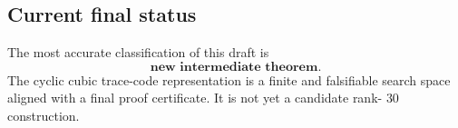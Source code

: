\subsection{Current final status}

The most accurate classification of this draft is
\[
\boxed{\textbf{new intermediate theorem}.}
\]
The cyclic cubic trace-code representation is a finite and falsifiable search
space aligned with a final proof certificate.  It is not yet a candidate rank-
$30$ construction.
